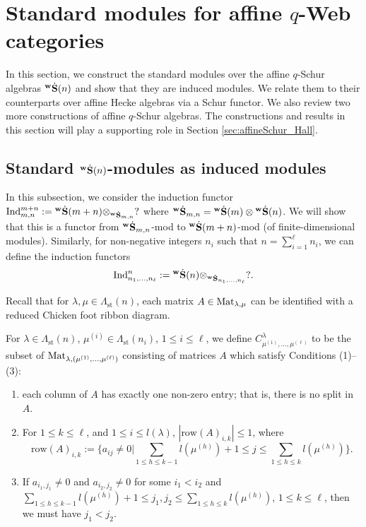 

\section{Standard modules for affine $q$-Web categories}
\label{sec:standard}

In this section, we construct the standard modules over the affine $q$-Schur algebras ${}^{\bold{w}}\dot{\bold{S}}(n)$ and show that they are induced modules. We relate them to their counterparts over affine Hecke algebras via a Schur functor. We also review two more constructions of affine $q$-Schur algebras. The constructions and results in this section will play a supporting role in Section \ref{sec:affineSchur_Hall}. 

\subsection{Standard ${}^{\bold{w}}\dot{\bold{S}}(n)$-modules as induced modules}
\label{ssec:induced}

In this subsection, we consider the induction functor
$\operatorname{Ind}\nolimits^{m+n}_{m,n}:= {}^{\bold{w}}\dot{\bold{S}}(m+n)\otimes_{{}^{\bold{w}}\dot{\bold{S}}_{m,n}} ?$
where $ {}^{\bold{w}}\dot{\bold{S}}_{m,n}={}^{\bold{w}}\dot{\bold{S}}(m)\otimes {}^{\bold{w}}\dot{\bold{S}}(n)$. We will show that this is a functor from ${}^{\bold{w}}\dot{\bold{S}}_{m,n}$-mod to ${}^{\bold{w}}\dot{\bold{S}}(m+n)$-mod
(of finite-dimensional modules).
Similarly, for non-negative integers $n_i$ such that $n=\sum_{i=1}^\ell n_i$, we can define the induction functors 
\begin{align} \label{eq:Ind}
\operatorname{Ind}\nolimits_{n_1,\ldots,n_\ell}^n := {}^{\bold{w}}\dot{\bold{S}}(n)\otimes_{{}^{\bold{w}}\dot{\bold{S}}_{n_1,\ldots,n_\ell}} ?.
\end{align}

Recall that for $\lambda,\mu\in \Lambda_{\text{st}}(n)$, each matrix $A\in \text{Mat}_{\lambda,\mu}$ can be identified with a reduced Chicken foot ribbon diagram.

    For $\lambda\in \Lambda_{\text{st}}(n)$, $\mu^{(i)}\in \Lambda_{\text{st}}(n_i)$, $1\le i\le \ell$, we define 
  $C^\lambda_{\mu^{(1)}, \ldots,\mu^{(\ell)}}$ to be the subset of $\text{Mat}_{\lambda, (\mu^{(1)}, \ldots, \mu^{(\ell)})}$
  consisting of matrices $A$ which satisfy Conditions (1)--(3): 
\begin{enumerate}
    \item each column of $A$ has exactly one non-zero entry; that is, there is no split in $A$. 
    \item 
    For $1\le k\le \ell$, and $1\le i\le l(\lambda)$, $|\text{row}(A)_{i,k}|\le 1$, where 
    \[
    \text{row}(A)_{i,k}:= 
    \Big\{ a_{ij}\neq 0 \Big | \sum_{1\le h\le k-1}l(\mu^{(h)}) +1 \le j\le\sum_{1\le h\le k}l(\mu^{(h)}) \Big\}. 
    \]
    \item If $a_{i_1,j_1}\neq 0$ and $a_{i_2,j_2}\neq 0$ for some 
        $i_1<i_2$ and $\sum_{1\le h\le k-1}l(\mu^{(h)}) +1 \le j_1,j_2\le\sum_{1\le h\le k}l(\mu^{(h)}) $, $1\le k\le \ell$, then we must have $j_1<j_2$.
\end{enumerate}
  

